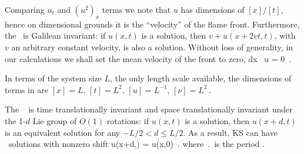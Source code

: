 Comparing $u_t$ and $(u^2)_x$ terms we note that $u$ has
dimensions of $[x]/[t]$, hence on dimensional grounds
it is the ``velocity'' of the flame front. 
Furthermore, the  \KSe\ is
Galilean invariant: if $u(x,t)$ is a solution, then 
$v+u(x+2vt,t)$, with $v$ an arbitrary constant velocity, is also a solution. 
Without loss of generality, in our calculations we shall set 
the mean velocity of the  front to zero,
\beq
\int dx \, u = 0
\,.

In terms of the system size $L$, the only length scale available,
the dimensions of terms in  are
$ %
[x]=L
$, $%
[t]=L^2
$, $%
[u]=L^{-1}
$, $%
[\nu]=L^2
\,.
$ %


The \KSe\   is
time translationally invariant
and 
space translationally invariant
under the 1-$d$ Lie group of $O(1)$ rotations: if
$u(x,t)$ is a solution, then $u(x+d,t)$ is an equivalent
solution for any $-L/2 < d \leq L/2$.
As a result,
KS can have \rpo\ solutions with nonzero shift
\beq
u(x+d,\period{}) = u(x,0)
\,.
where $\period{}$ is the period  . 

